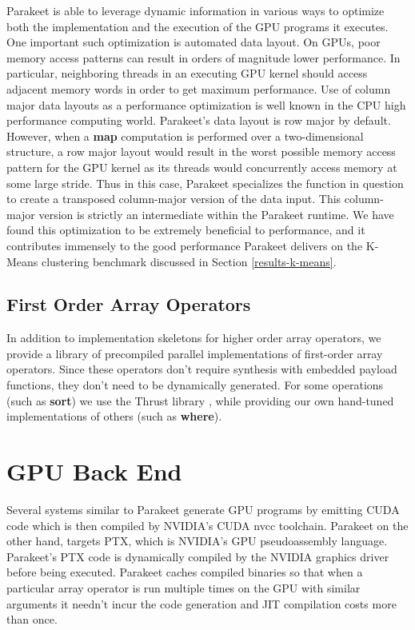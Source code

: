 \documentclass[10pt,twocolumn]{article}
\begin{document}
Parakeet is able to leverage dynamic information in various ways to optimize both the implementation and the execution of the GPU programs it executes.  One important such optimization is automated data layout.  On GPUs, poor memory access patterns can result in orders of magnitude lower performance.  In particular, neighboring threads in an executing GPU kernel should access adjacent memory words in order to get maximum performance.  Use of column major data layouts as a performance optimization is well known in the CPU high performance computing world.  Parakeet's data layout is row major by default.  However, when a \textbf{map} computation is performed over a two-dimensional structure, a row major layout would result in the worst possible memory access pattern for the GPU kernel as its threads would concurrently access memory at some large stride.  Thus in this case, Parakeet specializes the function in question to create a transposed column-major version of the data input.  This column-major version is strictly an intermediate within the Parakeet runtime.  We have found this optimization to be extremely beneficial to performance, and it contributes immensely to the good performance Parakeet delivers on the K-Means clustering benchmark discussed in Section \ref{results-k-means}.

\subsection{First Order Array Operators}
In addition to implementation skeletons for higher order array operators, we provide a library of precompiled parallel implementations of first-order array operators. Since these operators don't require synthesis with embedded payload functions, they don't need to be dynamically generated. For some operations (such as \textbf{sort}) we use the Thrust library \cite{Hobe10}, while providing our own hand-tuned implementations of others (such as \textbf{where}).

\section{GPU Back End}
Several systems similar to Parakeet \cite{Cata11,Chaf11} generate GPU programs by emitting CUDA code which is then compiled by NVIDIA's CUDA nvcc toolchain. Parakeet on the other hand, targets PTX, which is NVIDIA's GPU pseudoassembly language. Parakeet's PTX code is dynamically compiled by the NVIDIA graphics driver before being executed.  Parakeet caches compiled binaries so that when a particular array operator is run multiple times on the GPU with similar arguments it needn't incur the code generation and JIT compilation costs more than once.
\end{document}
